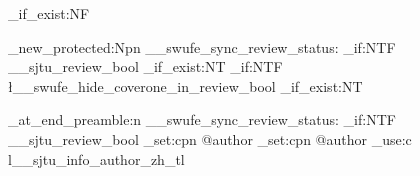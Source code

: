 \newcommand{\swufezhdisplaytitle}{\swufe_get_display_title_zh:}
\newcommand{\swufeendisplaytitle}{\swufe_get_display_title_en:}
\newcommand{\swufezhtitle}{\tl_use:c { l__sjtu_info_title_zh_tl }}
\newcommand{\swufeentitle}{\tl_use:c { l__sjtu_info_title_en_tl }}
\newcommand{\swufeauthor}{\tl_use:c { l__sjtu_info_author_zh_tl }}
\newcommand{\swufesupervisor}{\tl_use:c { l__sjtu_info_supervisor_zh_tl }}
\newcommand{\swufemajor}{\tl_use:c { l__sjtu_info_major_zh_tl }}
\newcommand{\swufedegree}{\tl_use:c { l__sjtu_info_degree_zh_tl }}
\newcommand{\swufeid}{\tl_use:c { l__sjtu_info_id_zh_tl }}
\newcommand{\swufeclassification}{\tl_use:N \l__swufe_info_classification_tl}
\newcommand{\swufesecretlevel}{\tl_use:N \l__swufe_info_secret_level_tl}
\newcommand{\swufeudc}{\tl_use:N \l__swufe_info_udc_tl}
\newcommand{\swuferesearchdirection}{\tl_use:N \l__swufe_info_research_direction_tl}
\newcommand{\swufefinaldate}{%
  \tl_if_empty:NTF \l__swufe_info_final_date_tl
    { \tl_use:c { l__sjtu_info_date_zh_tl } }
    { \tl_use:N \l__swufe_info_final_date_tl }%
}

\newif\ifswufereview
\newif\ifswufehidecoverone
\cs_if_exist:NF \ifreview { \newif\ifreview }

\cs_new_protected:Npn \__swufe_sync_review_status:
  {
    \bool_if:NTF \g__sjtu_review_bool
      {
        \swufereviewtrue
        \cs_if_exist:NT \reviewtrue { \reviewtrue }
        \bool_if:NTF \l__swufe_hide_coverone_in_review_bool
          { \swufehidecoveronetrue }
          { \swufehidecoveronefalse }
      }
      {
        \swufereviewfalse
        \cs_if_exist:NT \reviewfalse { \reviewfalse }
        \swufehidecoveronefalse
      }
  }

\ctex_at_end_preamble:n
  {
    \__swufe_sync_review_status:
    \bool_if:NTF \g__sjtu_review_bool
      { \cs_set:cpn { @author } { } }
      { \cs_set:cpn { @author } { \swufeauthor } }
  }
\ExplSyntaxOff

